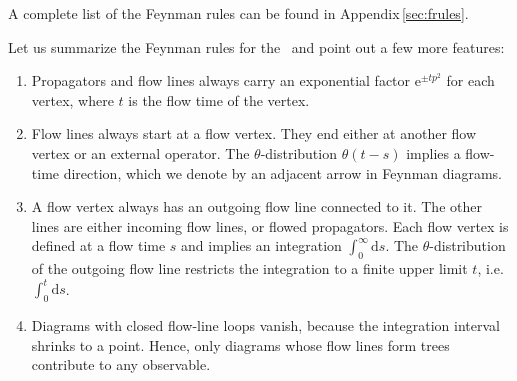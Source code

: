 A complete list of the Feynman rules can be found in
Appendix\,\ref{sec:frules}.

Let us summarize the Feynman rules for the \gff\ and point out a few
more features:
\begin{enumerate}
  \item Propagators and flow lines always carry an exponential factor
    $\mathrm{e}^{\pm tp^2}$ for each vertex, where $t$ is the flow time
    of the vertex.
  \item Flow lines always start at a flow vertex.  They end either at
    another flow vertex or an external operator. The $\theta$-distribution
    $\theta (t-s)$ implies a flow-time direction, which we denote by an
    adjacent arrow in Feynman diagrams.
  \item A flow vertex always has an outgoing flow line connected to it.
    The other lines are either incoming flow lines, or flowed
    propagators.  Each flow vertex is defined at a
    flow time $s$ and implies an integration $\int_0^\infty
    \mathrm{d}s$.  The $\theta$-distribution of the outgoing flow line
    restricts the integration to a finite upper limit $t$,
    i.e.\ $\int_0^t \mathrm{d}s$.
  \item Diagrams with closed flow-line loops vanish, because the
    integration interval shrinks to a point. Hence, only diagrams whose
    flow lines form trees contribute to any observable.
\end{enumerate}
